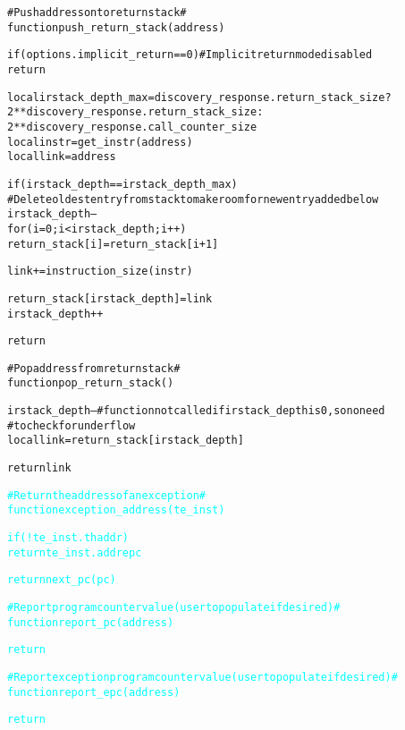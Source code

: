 \begin{alltt}
# Push address onto return stack #
function push_return_stack (address)

  if (options.implicit_return == 0) # Implicit return mode disabled
    return

  local irstack_depth_max = discovery_response.return_stack_size ?
                             2**discovery_response.return_stack_size :
                             2**discovery_response.call_counter_size
  local instr             = get_instr(address)
  local link              = address

  if (irstack_depth == irstack_depth_max)
    # Delete oldest entry from stack to make room for new entry added below
    irstack_depth--
    for (i = 0; i < irstack_depth; i++)
      return_stack[i] = return_stack[i+1]

  link += instruction_size(instr)

  return_stack[irstack_depth] = link
  irstack_depth++

  return

# Pop address from return stack #
function pop_return_stack ()

  irstack_depth-- # function not called if irstack_depth is 0, so no need
                  #  to check for underflow
  local  link = return_stack[irstack_depth]

  return link

\textcolor{cyan}{# Return the address of an exception #}
\textcolor{cyan}{function exception_address(te_inst)}

\textcolor{cyan}{  if (!te_inst.thaddr)}
\textcolor{cyan}{    return te_inst.addrepc}

\textcolor{cyan}{  return next_pc(pc)}
\end{alltt}

\pagebreak

\begin{alltt}
\textcolor{cyan}{# Report program counter value (user to populate if desired) #}
\textcolor{cyan}{function report_pc(address)}

\textcolor{cyan}{  return}
  
\textcolor{cyan}{# Report exception program counter value (user to populate if desired) #}
\textcolor{cyan}{function report_epc(address)}

\textcolor{cyan}{  return}
  
\end{alltt}
